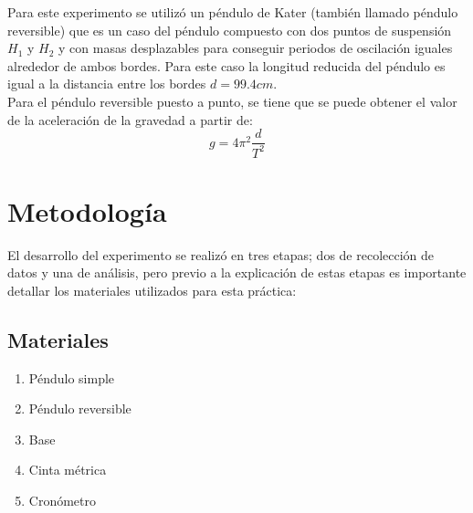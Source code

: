 \documentclass[spanish,notitlepage,letterpaper, 12pt]{article}
\begin{document}
Para este experimento se utilizó un péndulo de Kater (también llamado péndulo reversible) que es un caso del péndulo compuesto con dos puntos de suspensión $H_1$ y $H_2$ y con masas desplazables para conseguir periodos de oscilación iguales alrededor de ambos bordes. Para este caso la longitud reducida del péndulo es igual a la distancia entre los
bordes $d=99.4cm$.\\

Para el péndulo reversible puesto a punto, se tiene que se puede obtener el valor de la
aceleración de la gravedad a partir de:
\begin{equation}
    \label{eq:12}
    g=4\pi^2\frac{d}{T^2}
\end{equation}
\section{Metodología}
El desarrollo del experimento se realizó en tres etapas; dos de recolección de datos y una de análisis, pero previo a la explicación de estas etapas es importante detallar los materiales utilizados para esta práctica:
\subsection{Materiales}
\begin{enumerate}
    \item Péndulo simple
    \item Péndulo reversible
    \item Base
    \item Cinta métrica
    \item Cronómetro
\end{enumerate}
\end{document}
